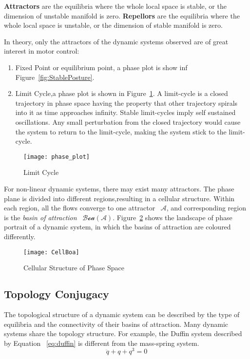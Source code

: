\textbf{Attractors} are the equilibria where the whole local space is stable, or the dimension of unstable manifold is zero.
\textbf{Repellors} are the equilibria where the whole local space is unstable, or the dimension of stable manifold is zero.







In theory, only the attractors of the dynamic systems  observed are of great interest in motor control:
\begin{enumerate}
 \item Fixed Point or equilibrium point, a phase plot  is show inf Figure~\ref{fig:StablePosture}.
 \item Limit Cycle,a phase plot is shown in Figure~\ref{fig:ecycle}.
 A limit-cycle  is a closed trajectory in phase space having the property that other trajectory spirals into it as time approaches infinity.
Stable limit-cycles imply self sustained oscillations. Any small perturbation from the closed trajectory would cause the system to return to the limit-cycle, making the system stick to the limit-cycle.
\end{enumerate}

\begin{figure}
	\begin{center}
	\texttt{[image: phase\_plot]}
	\end{center}
	\caption{Limit Cycle}
	\label{fig:ecycle}
\end{figure}





For non-linear dynamic systems, there may exist many attractors.
The phase plane is divided into different regions,resulting in a cellular structure.
Within each region, all the flows converge to one attractor ~$\mathcal{A}$,
and corresponding region is  the \emph{basin of attraction} ~$\mathcal{Boa}(\mathcal{A})$.
Figure~\ref{fig:manyboa} shows the landscape of phase portrait of a dynamic system, in which the basins of attraction are coloured differently.
\begin{figure}
\begin{center}
\texttt{[image: CellBoa]}
\end{center}
\caption{Cellular Structure of Phase Space}
\label{fig:manyboa}
\end{figure}




\subsection{Topology Conjugacy}
The topological structure of a dynamic system can be described by the type of equilibria and the connectivity of their basins of attraction.
Many dynamic systems share the topology structure.
For example, the Duffin system described by Equation ~\ref{eq:duffin} is different from the mass-spring system.
\begin{equation}
\label{eq:duffin}
\ddot{q}+q+q^{3}=0
\end{equation}

